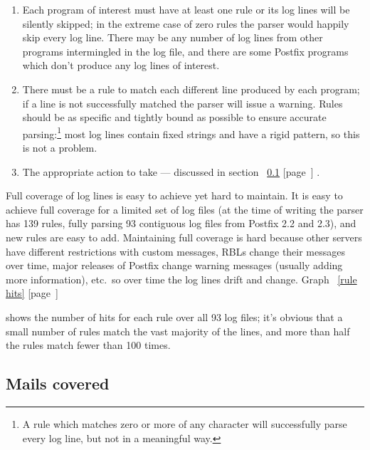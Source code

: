 \documentclass[a4paper,12pt,draft]{article}
\newcommand{\refwithpage}[1]{%
    \empty{}\ref{#1} [page~\pageref{#1}]%
}
\begin{document}
\begin{enumerate}

    \item Each program of interest must have at least one rule or its log
        lines will be silently skipped; in the extreme case of zero rules
        the parser would happily skip every log line.  There may be any
        number of log lines from other programs intermingled in the log
        file, and there are some Postfix programs which don't produce any
        log lines of interest.

    \item There must be a rule to match each different line produced by
        each program; if a line is not successfully matched the parser will
        issue a warning.  Rules should be as specific and tightly bound as
        possible to ensure accurate parsing:\footnote{A rule which matches
        zero or more of any character will successfully parse every log
        line, but not in a meaningful way.} most log lines contain fixed
        strings and have a rigid pattern, so this is not a problem.

    \item The appropriate action to take --- discussed in
        section~\refwithpage{mails-covered}.

\end{enumerate}

Full coverage of log lines is easy to achieve yet hard to maintain.  It is
easy to achieve full coverage for a limited set of log files (at the time
of writing the parser has 139 rules, fully parsing 93 contiguous log files
from Postfix 2.2 and 2.3), and new rules are easy to add.  Maintaining full
coverage is hard because other servers have different restrictions with
custom messages, RBLs change their messages over time, major releases of
Postfix change warning messages (usually adding more information), etc.\ so
over time the log lines drift and change.  Graph~\refwithpage{rule hits}
shows the number of hits for each rule over all 93 log files; it's obvious
that a small number of rules match the vast majority of the lines, and more
than half the rules match fewer than 100 times.

\subsection{Mails covered}

\label{mails-covered}
\end{document}
